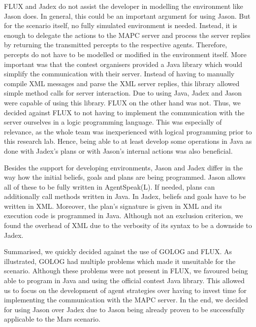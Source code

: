 FLUX and Jadex do not assist the developer in modelling the environment like Jason does.
In general, this could be an important argument for using Jason.
But for the \mars scenario itself, no fully simulated environment is needed.
Instead, it is enough to delegate the actions to the MAPC server and process the server replies by returning the transmitted percepts to the respective agents.
Therefore, percepts do not have to be modelled or modified in the environment itself.
More important was that the contest organisers provided a Java library which would simplify the communication with their server.
Instead of having to manually compile XML messages and parse the XML server replies, this library allowed simple method calls for server interaction.
Due to using Java, Jadex and Jason were capable of using this library.
FLUX on the other hand was not.
Thus, we decided against FLUX to not having to implement the communication with the server ourselves in a logic programming language.
This was especially of relevance, as the whole team was inexperienced with logical programming prior to this research lab.
Hence, being able to at least develop some operations in Java as done with Jadex's plans or with Jason's internal actions was also beneficial.

Besides the support for developing environments, Jason and Jadex differ in the way how the initial beliefs, goals and plans are being programmed.
Jason allows all of these to be fully written in AgentSpeak(L).
If needed, plans can additionally call methods written in Java.
In Jadex, beliefs and goals have to be written in XML.
Moreover, the plan's signature is given in XML and its execution code is programmed in Java.
Although not an exclusion criterion, we found the overhead of XML due to the verbosity of its syntax to be a downside to Jadex.

Summarised, we quickly decided against the use of GOLOG and FLUX.
As illustrated, GOLOG had multiple problems which made it unsuitable for the \mars scenario.
Although these problems were not present in FLUX, we favoured being able to program in Java and using the official contest Java library.
This allowed us to focus on the development of agent strategies over having to invest time for implementing the communication with the MAPC server.
In the end, we decided for using Jason over Jadex due to Jason being already proven to be successfully applicable to the Mars scenario.
